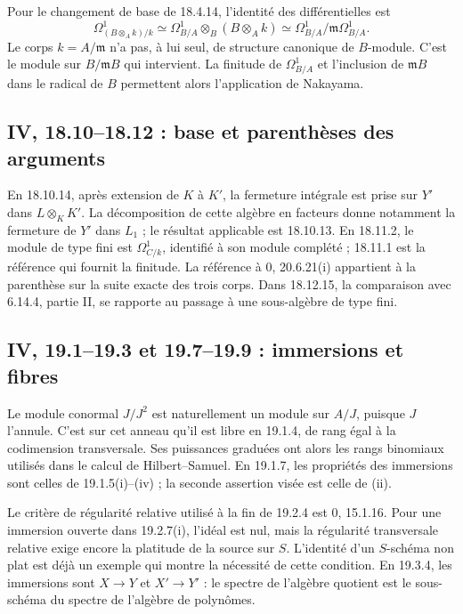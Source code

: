 \documentclass[11pt,a4paper]{article}
\begin{document}
Pour le changement de base de 18.4.14, l'identité des différentielles est
\[
 \Omega^1_{(B\otimes_A k)/k}
   \simeq \Omega^1_{B/A}\otimes_B(B\otimes_A k)
   \simeq \Omega^1_{B/A}/\mathfrak m\Omega^1_{B/A}.
\]
Le corps $k=A/\mathfrak m$ n'a pas, à lui seul, de structure canonique
de $B$-module. C'est le module sur $B/\mathfrak mB$ qui intervient.
La finitude de $\Omega^1_{B/A}$ et l'inclusion de $\mathfrak mB$ dans
le radical de $B$ permettent alors l'application de Nakayama.

\subsection{IV, 18.10--18.12 : base et parenthèses des arguments}
\label{note:iv4-normalization}
En 18.10.14, après extension de $K$ à $K'$, la fermeture intégrale
est prise sur $Y'$ dans $L\otimes_K K'$. La décomposition de cette
algèbre en facteurs donne notamment la fermeture de $Y'$ dans
$L_1$ ; le résultat applicable est 18.10.13.
En 18.11.2, le module de type fini est $\Omega^1_{C/k}$,
identifié à son module complété ; 18.11.1 est la référence qui
fournit la finitude. La référence à 0, 20.6.21(i) appartient à la
parenthèse sur la suite exacte des trois corps.
Dans 18.12.15, la comparaison avec 6.14.4, partie II, se rapporte
au passage à une sous-algèbre de type fini.

\subsection{IV, 19.1--19.3 et 19.7--19.9 : immersions et fibres}
\label{note:iv4-immersions}
Le module conormal $J/J^2$ est naturellement un module sur $A/J$,
puisque $J$ l'annule. C'est sur cet anneau qu'il est libre en 19.1.4,
de rang égal à la codimension transversale. Ses puissances graduées
ont alors les rangs binomiaux utilisés dans le calcul de Hilbert--Samuel.
En 19.1.7, les propriétés des immersions sont celles de 19.1.5(i)--(iv) ;
la seconde assertion visée est celle de (ii).

Le critère de régularité relative utilisé à la fin de 19.2.4 est
0, 15.1.16. Pour une immersion ouverte dans 19.2.7(i), l'idéal est nul,
mais la régularité transversale relative exige encore la platitude
de la source sur $S$. L'identité d'un $S$-schéma non plat est déjà
un exemple qui montre la nécessité de cette condition.
En 19.3.4, les immersions sont $X\to Y$ et $X'\to Y'$ :
le spectre de l'algèbre quotient est le sous-schéma du spectre de
l'algèbre de polynômes.
\end{document}
